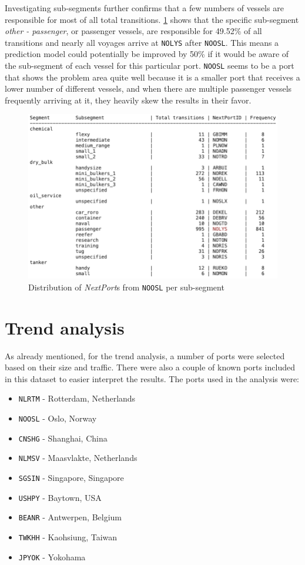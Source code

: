 Investigating sub-segments further confirms that a few numbers of vessels are responsible for most of all total transitions. \cref{fig:apw_noosl_subsegments} shows that the specific sub-segment \textit{other - passenger}, or passenger vessels, are responsible for 49.52\% of all transitions and nearly all voyages arrive at \texttt{NOLYS} after \texttt{NOOSL}. This means a prediction model could potentially be improved by 50\% if it would be aware of the sub-segment of each vessel for this particular port. \texttt{NOOSL} seems to be a port that shows the problem area quite well because it is a smaller port that receives a lower number of different vessels, and when there are multiple passenger vessels frequently arriving at it, they heavily skew the results in their favor.

\begin{figure}[htbp]
    \centering
    \includegraphics[width=.8\textwidth]{figures/apw/noosl_subsegments.png}
    \caption{Distribution of \textit{NextPort}s from \texttt{NOOSL} per sub-segment}
    \label{fig:apw_noosl_subsegments}
\end{figure}


\section{Trend analysis}
\label{sec:trend_analysis}

As already mentioned, for the trend analysis, a number of ports were selected based on their size and traffic. There were also a couple of known ports included in this dataset to easier interpret the results. The ports used in the analysis were:

\begin{itemize}
    \item \texttt{NLRTM} - Rotterdam, Netherlands
    \item \texttt{NOOSL} - Oslo, Norway
    \item \texttt{CNSHG} - Shanghai, China
    \item \texttt{NLMSV} - Maasvlakte, Netherlands
    \item \texttt{SGSIN} - Singapore, Singapore
    \item \texttt{USHPY} - Baytown, USA
    \item \texttt{BEANR} - Antwerpen, Belgium
    \item \texttt{TWKHH} - Kaohsiung, Taiwan
    \item \texttt{JPYOK} - Yokohama
\end{itemize}

